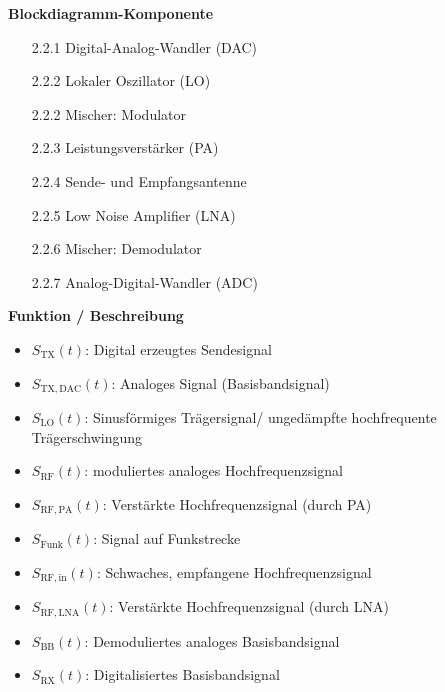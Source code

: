 \begin{minipage}{0.48\textwidth}
    \raggedright
    \textbf{\large Blockdiagramm-Komponente}\\[2ex]
    \begin{enumerate}
        \item [2.2.1] Digital-Analog-Wandler (DAC)
        \item [2.2.2] Lokaler Oszillator (LO)
        \item [2.2.2] Mischer: Modulator
        \item [2.2.3] Leistungsverstärker (PA)
        \item [2.2.4] Sende- und Empfangsantenne
        \item [2.2.5] Low Noise Amplifier (LNA)
        \item [2.2.6] Mischer: Demodulator
        \item [2.2.7] Analog-Digital-Wandler (ADC)
        
    \end{enumerate}
\end{minipage}%
\hfill
\begin{minipage}{0.48\textwidth}
    \raggedright
    \textbf{\large Funktion / Beschreibung}\\[2ex]
    \begin{itemize}
        \item $S_{\mathrm{TX}}(t)$: Digital erzeugtes Sendesignal
        \item $S_{\mathrm{TX,DAC}}(t)$: Analoges Signal (Basisbandsignal)
        \item $S_{\mathrm{LO}}(t)$: Sinusförmiges Trägersignal/ ungedämpfte hochfrequente Trägerschwingung
        \item $S_{\mathrm{RF}}(t)$: moduliertes analoges Hochfrequenzsignal
        \item $S_{\mathrm{RF,PA}}(t)$: Verstärkte Hochfrequenzsignal (durch PA)
        \item $S_{\mathrm{Funk}}(t)$: Signal auf Funkstrecke
        \item $S_{\mathrm{RF,in}}(t)$: Schwaches, empfangene Hochfrequenzsignal
        \item $S_{\mathrm{RF,LNA}}(t)$: Verstärkte Hochfrequenzsignal (durch LNA)
        \item $S_{\mathrm{BB}}(t)$: Demoduliertes analoges Basisbandsignal
        \item $S_{\mathrm{RX}}(t)$: Digitalisiertes Basisbandsignal
    \end{itemize}
\end{minipage}



